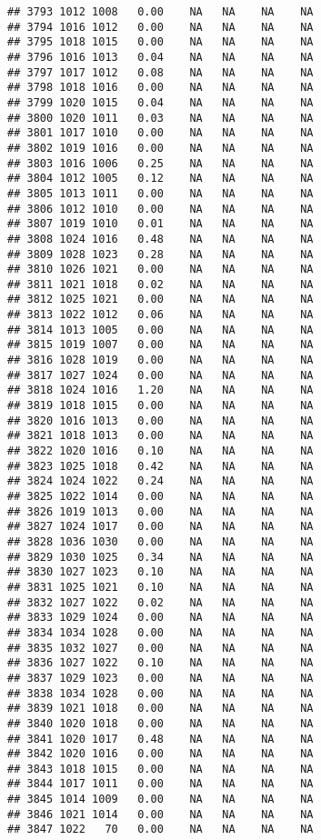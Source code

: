 \documentclass{article}\usepackage{graphicx, color}
\makeatletter
\newenvironment{kframe}{%
 \def\at@end@of@kframe{}%
 \ifinner\ifhmode%
  \def\at@end@of@kframe{\end{minipage}}%
  \begin{minipage}{\columnwidth}%
 \fi\fi%
 \def\FrameCommand##1{\hskip\@totalleftmargin \hskip-\fboxsep
 \colorbox{shadecolor}{##1}\hskip-\fboxsep
     \hskip-\linewidth \hskip-\@totalleftmargin \hskip\columnwidth}%
 \MakeFramed {\advance\hsize-\width
   \@totalleftmargin\z@ \linewidth\hsize
   \@setminipage}}%
 {\par\unskip\endMakeFramed%
 \at@end@of@kframe}
\newenvironment{knitrout}{}{} %
\makeatother
\begin{document}
\begin{knitrout}
\begin{kframe}
\begin{verbatim}
## 3793 1012 1008   0.00    NA   NA    NA    NA
## 3794 1016 1012   0.00    NA   NA    NA    NA
## 3795 1018 1015   0.00    NA   NA    NA    NA
## 3796 1016 1013   0.04    NA   NA    NA    NA
## 3797 1017 1012   0.08    NA   NA    NA    NA
## 3798 1018 1016   0.00    NA   NA    NA    NA
## 3799 1020 1015   0.04    NA   NA    NA    NA
## 3800 1020 1011   0.03    NA   NA    NA    NA
## 3801 1017 1010   0.00    NA   NA    NA    NA
## 3802 1019 1016   0.00    NA   NA    NA    NA
## 3803 1016 1006   0.25    NA   NA    NA    NA
## 3804 1012 1005   0.12    NA   NA    NA    NA
## 3805 1013 1011   0.00    NA   NA    NA    NA
## 3806 1012 1010   0.00    NA   NA    NA    NA
## 3807 1019 1010   0.01    NA   NA    NA    NA
## 3808 1024 1016   0.48    NA   NA    NA    NA
## 3809 1028 1023   0.28    NA   NA    NA    NA
## 3810 1026 1021   0.00    NA   NA    NA    NA
## 3811 1021 1018   0.02    NA   NA    NA    NA
## 3812 1025 1021   0.00    NA   NA    NA    NA
## 3813 1022 1012   0.06    NA   NA    NA    NA
## 3814 1013 1005   0.00    NA   NA    NA    NA
## 3815 1019 1007   0.00    NA   NA    NA    NA
## 3816 1028 1019   0.00    NA   NA    NA    NA
## 3817 1027 1024   0.00    NA   NA    NA    NA
## 3818 1024 1016   1.20    NA   NA    NA    NA
## 3819 1018 1015   0.00    NA   NA    NA    NA
## 3820 1016 1013   0.00    NA   NA    NA    NA
## 3821 1018 1013   0.00    NA   NA    NA    NA
## 3822 1020 1016   0.10    NA   NA    NA    NA
## 3823 1025 1018   0.42    NA   NA    NA    NA
## 3824 1024 1022   0.24    NA   NA    NA    NA
## 3825 1022 1014   0.00    NA   NA    NA    NA
## 3826 1019 1013   0.00    NA   NA    NA    NA
## 3827 1024 1017   0.00    NA   NA    NA    NA
## 3828 1036 1030   0.00    NA   NA    NA    NA
## 3829 1030 1025   0.34    NA   NA    NA    NA
## 3830 1027 1023   0.10    NA   NA    NA    NA
## 3831 1025 1021   0.10    NA   NA    NA    NA
## 3832 1027 1022   0.02    NA   NA    NA    NA
## 3833 1029 1024   0.00    NA   NA    NA    NA
## 3834 1034 1028   0.00    NA   NA    NA    NA
## 3835 1032 1027   0.00    NA   NA    NA    NA
## 3836 1027 1022   0.10    NA   NA    NA    NA
## 3837 1029 1023   0.00    NA   NA    NA    NA
## 3838 1034 1028   0.00    NA   NA    NA    NA
## 3839 1021 1018   0.00    NA   NA    NA    NA
## 3840 1020 1018   0.00    NA   NA    NA    NA
## 3841 1020 1017   0.48    NA   NA    NA    NA
## 3842 1020 1016   0.00    NA   NA    NA    NA
## 3843 1018 1015   0.00    NA   NA    NA    NA
## 3844 1017 1011   0.00    NA   NA    NA    NA
## 3845 1014 1009   0.00    NA   NA    NA    NA
## 3846 1021 1014   0.00    NA   NA    NA    NA
## 3847 1022   70   0.00    NA   NA    NA    NA

\end{verbatim}
\end{kframe}
\end{knitrout}
\end{document}
